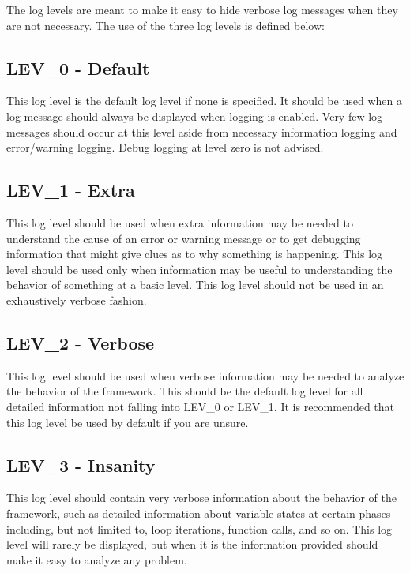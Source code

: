 \documentclass{report}
\begin{document}
\par
The log levels are meant to make it easy to hide verbose log
messages when they are not necessary.  The use of the three log
levels is defined below:

        \subsection{LEV\_0 - Default}

This log level is the default log level if none is specified.  It
should be used when a log message should always be displayed when
logging is enabled. Very few log messages should occur at this level
aside from necessary information logging and error/warning logging.
Debug logging at level zero is not advised.

        \subsection{LEV\_1 - Extra}

This log level should be used when extra information may be needed
to understand the cause of an error or warning message or to get
debugging information that might give clues as to why something is
happening.  This log level should be used only when information may
be useful to understanding the behavior of something at a basic
level.  This log level should not be used in an exhaustively verbose
fashion.

        \subsection{LEV\_2 - Verbose}

This log level should be used when verbose information may be needed
to analyze the behavior of the framework.  This should be the
default log level for all detailed information not falling into
LEV\_0 or LEV\_1. It is recommended that this log level be used by
default if you are unsure.

        \subsection{LEV\_3 - Insanity}

This log level should contain very verbose information about the
behavior of the framework, such as detailed information about variable
states at certain phases including, but not limited to, loop iterations,
function calls, and so on.  This log level will rarely be displayed,
but when it is the information provided should make it easy to analyze
any problem.
\end{document}
